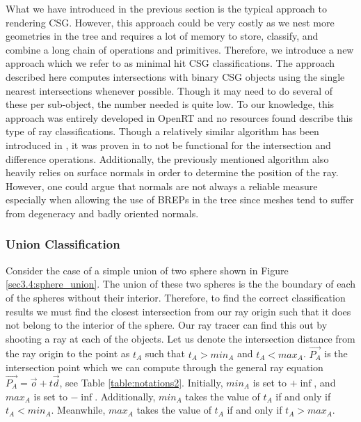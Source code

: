 \documentclass[a4paper,11pt,oneside]{article}
\begin{document}
What we have introduced in the previous section is the typical approach to rendering CSG. However, this approach could be very costly as we nest more geometries in the tree and requires a lot of memory to store, classify, and combine a long chain of operations and primitives. Therefore, we introduce a new approach which we refer to as minimal hit CSG classifications. The approach described here computes intersections with binary CSG objects using the single nearest intersections whenever possible. Though it may need to do several of these per sub-object, the number needed is quite low. To our knowledge, this approach was entirely developed in OpenRT and no resources found describe this type of ray classifications. Though a relatively similar algorithm has been introduced in \cite{kensler_ray_2006}, it was proven in \cite{csg-xrt-renderer} to not be functional for the intersection and difference operations. Additionally, the previously mentioned algorithm also heavily relies on surface normals in order to determine the position of the ray. However, one could argue that normals are not always a reliable measure especially when allowing the use of BREPs in the tree since meshes tend to suffer from degeneracy and badly oriented normals.

\subsubsection{Union Classification}

Consider the case of a simple union of two sphere shown in Figure \ref{sec3.4:sphere_union}. The union of these two spheres is the the boundary of each of the spheres without their interior. Therefore, to find the correct classification results we must find the closest intersection from our ray origin such that it does not belong to the interior of the sphere. Our ray tracer can find this out by shooting a ray at each of the objects. Let us denote the intersection distance from the ray origin to the point as $t_A$ such that $t_A > min_A$ and $t_A < max_A$. $\vec{P_A}$ is the intersection point which we can compute through the general ray equation $\vec{P_A} = \vec{o} + t\vec{d}$, see Table \ref{table:notations2}. Initially, $min_A$ is set to $+\inf$, and $max_A$ is set to $-\inf$. Additionally, $min_A$ takes the value of $t_A$ if and only if $t_A < min_A$. Meanwhile, $max_A$ takes the value of $t_A$ if and only if $t_A > max_A$.
\end{document}
